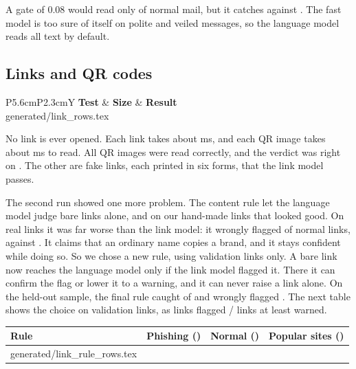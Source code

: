 \documentclass[11pt,a4paper]{article}
\makeatletter
\newcommand{\need}[1][10]{\Needspace{#1\baselineskip}}
\newcommand{\tablerows}[1]{\@@input #1 }
\makeatother
\begin{document}
A gate of 0.08 would read only \gateHighMail{} of normal mail, but it catches \gateHighCaught{} against \gateZeroCaught{}. The fast model is too sure of itself on polite and veiled messages, so the language model reads all text by default.

\need[12]
\subsection*{Links and QR codes}

\begin{center}
\small
\begin{tabularx}{\linewidth}{P{5.6cm}P{2.3cm}Y}
\toprule
\textbf{Test} & \textbf{Size} & \textbf{Result} \\
\midrule
\tablerows{generated/link_rows.tex}
\bottomrule
\end{tabularx}
\end{center}

No link is ever opened. Each link takes about \linkMs{} ms, and each QR image takes about \qrMs{} ms to read. All \qrImages{} QR images were read correctly, and the verdict was right on \qrRight{}. The other \qrWrong{} are \qrWrongCodes{} fake links, each printed in six forms, that the link model passes.

The second run showed one more problem. The content rule let the language model judge bare links alone, and on our hand-made links that looked good. On real links it was far worse than the link model: it wrongly flagged \linkSampleWrong{} of \linkSampleEach{} normal links, against \linkSampleFastWrong{}. It claims that an ordinary name copies a brand, and it stays confident while doing so. So we chose a new rule, using validation links only. A bare link now reaches the language model only if the link model flagged it. There it can confirm the flag or lower it to a warning, and it can never raise a link alone. On the held-out sample, the final rule caught \linkFinalCaught{} of \linkSampleEach{} and wrongly flagged \linkFinalWrong{}. The next table shows the choice on validation links, as links flagged / links at least warned.

\begin{center}
\small
\begin{tabular}{@{}lrrr@{}}
\toprule
\textbf{Rule} & \textbf{Phishing ({})} & \textbf{Normal ({})} & \textbf{Popular sites ({})} \\
\midrule
\tablerows{generated/link_rule_rows.tex}
\bottomrule
\end{tabular}
\end{center}
\end{document}
